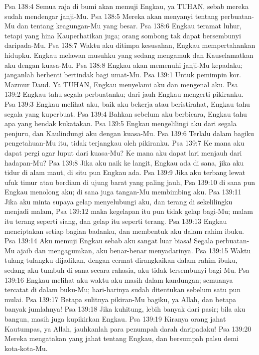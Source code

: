 Psa 138:4  Semua raja di bumi akan memuji Engkau, ya TUHAN, sebab mereka sudah mendengar janji-Mu.
Psa 138:5  Mereka akan menyanyi tentang perbuatan-Mu dan tentang keagungan-Mu yang besar.
Psa 138:6  Engkau teramat luhur, tetapi yang hina Kauperhatikan juga; orang sombong tak dapat bersembunyi daripada-Mu.
Psa 138:7  Waktu aku ditimpa kesusahan, Engkau mempertahankan hidupku. Engkau melawan musuhku yang sedang mengamuk dan Kauselamatkan aku dengan kuasa-Mu.
Psa 138:8  Engkau akan memenuhi janji-Mu kepadaku; janganlah berhenti bertindak bagi umat-Mu.
Psa 139:1  Untuk pemimpin kor. Mazmur Daud. Ya TUHAN, Engkau menyelami aku dan mengenal aku.
Psa 139:2  Engkau tahu segala perbuatanku; dari jauh Engkau mengerti pikiranku.
Psa 139:3  Engkau melihat aku, baik aku bekerja atau beristirahat, Engkau tahu segala yang kuperbuat.
Psa 139:4  Bahkan sebelum aku berbicara, Engkau tahu apa yang hendak kukatakan.
Psa 139:5  Engkau mengelilingi aku dari segala penjuru, dan Kaulindungi aku dengan kuasa-Mu.
Psa 139:6  Terlalu dalam bagiku pengetahuan-Mu itu, tidak terjangkau oleh pikiranku.
Psa 139:7  Ke mana aku dapat pergi agar luput dari kuasa-Mu? Ke mana aku dapat lari menjauh dari hadapan-Mu?
Psa 139:8  Jika aku naik ke langit, Engkau ada di sana, jika aku tidur di alam maut, di situ pun Engkau ada.
Psa 139:9  Jika aku terbang lewat ufuk timur atau berdiam di ujung barat yang paling jauh,
Psa 139:10  di sana pun Engkau menolong aku; di sana juga tangan-Mu membimbing aku.
Psa 139:11  Jika aku minta supaya gelap menyelubungi aku, dan terang di sekelilingku menjadi malam,
Psa 139:12  maka kegelapan itu pun tidak gelap bagi-Mu; malam itu terang seperti siang, dan gelap itu seperti terang.
Psa 139:13  Engkau menciptakan setiap bagian badanku, dan membentuk aku dalam rahim ibuku.
Psa 139:14  Aku memuji Engkau sebab aku sangat luar biasa! Segala perbuatan-Mu ajaib dan mengagumkan, aku benar-benar menyadarinya.
Psa 139:15  Waktu tulang-tulangku dijadikan, dengan cermat dirangkaikan dalam rahim ibuku, sedang aku tumbuh di sana secara rahasia, aku tidak tersembunyi bagi-Mu.
Psa 139:16  Engkau melihat aku waktu aku masih dalam kandungan; semuanya tercatat di dalam buku-Mu; hari-harinya sudah ditentukan sebelum satu pun mulai.
Psa 139:17  Betapa sulitnya pikiran-Mu bagiku, ya Allah, dan betapa banyak jumlahnya!
Psa 139:18  Jika kuhitung, lebih banyak dari pasir; bila aku bangun, masih juga kupikirkan Engkau.
Psa 139:19  Kiranya orang jahat Kautumpas, ya Allah, jauhkanlah para penumpah darah daripadaku!
Psa 139:20  Mereka mengatakan yang jahat tentang Engkau, dan bersumpah palsu demi kota-kota-Mu.
